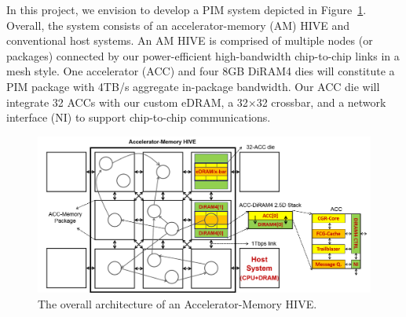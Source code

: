 \noindent 

In this project, we envision to develop a PIM system depicted in Figure~\ref{fig:arch}. 
Overall, the system consists of an accelerator-memory (AM) HIVE and conventional host systems. 
An AM HIVE is comprised of multiple nodes (or packages) connected by our power-efficient high-bandwidth chip-to-chip links in a mesh style. 
One accelerator (ACC) and four 8GB DiRAM4 dies will constitute a PIM package with 4TB/s aggregate in-package bandwidth. 
Our ACC die will integrate 32 ACCs with our custom eDRAM, a 32×32 crossbar, and a network interface (NI) to support chip-to-chip communications.

\begin{figure}
\center
\includegraphics[width=1.0\linewidth]{./fig/arch.png}
\caption{The overall architecture of an Accelerator-Memory HIVE.}
\label{fig:arch}
\end{figure}

